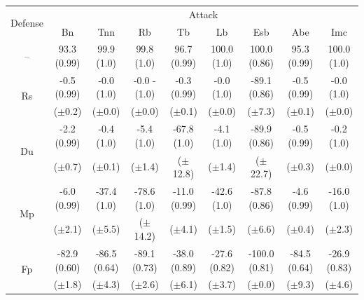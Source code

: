 \documentclass[compsoc,conference,a4paper,10pt,times]{IEEEtran}
\newcommand{\bn}{{\sc Bn}\xspace}
\newcommand{\tnn}{{\sc Tnn}\xspace}
\newcommand{\tb}{{\sc Tb}\xspace}
\newcommand{\lb}{{\sc Lb}\xspace}
\newcommand{\esb}{{\sc Esb}\xspace}
\newcommand{\rfb}{{\sc Rb}\xspace}
\newcommand{\abe}{{\sc Abe}\xspace}
\newcommand{\imc}{{\sc Imc}\xspace}
\newcommand{\du}{{\sc Du}\xspace}
\newcommand{\fp}{{\sc Fp}\xspace}
\newcommand{\rands}{{\sc Rs}\xspace}
\newcommand{\mmp}{{\sc Mp}\xspace}
\begin{document}
\begin{table}[!ht]{\footnotesize
    \centering
    \renewcommand{\arraystretch}{1.2}
    \begin{tabular}{c|c|c|c|c|c|c|c|c}
        \multirow{2}{*}{Defense} & \multicolumn{8}{c}{Attack} \\
        \cline{2-9}
             & \bn           & \tnn          & \rfb          & \tb           & \lb           & \esb          & \abe          & \imc \\
        \hline
        \hline
        -- & 93.3 (0.99) & 99.9 (1.0) & 99.8 (1.0) & 96.7 (0.99) & 100.0 (1.0) & 100.0 (0.86) & 95.3 (0.99) & 100.0 (1.0) \\
        \hline
        \hline
        \multirow{2}{*}{\rands}      & -0.5 (0.99) & -0.0 (1.0) & -0.0 -(1.0) & -0.3 (0.99) & -0.0 (1.0) & -89.1 (0.86) & -0.5 (0.99) & -0.0 (1.0)  \\
                                     & ($\pm$0.2) & ($\pm$0.0) & ($\pm$0.0) & ($\pm$0.1) & ($\pm$0.0) & ($\pm$7.3) & ($\pm$0.1) & ($\pm$0.0) \\
        \hline
        \multirow{2}{*}{\du}         & -2.2 (0.99) & -0.4 (1.0) & -5.4 (1.0) & \cellcolor{Red}-67.8 (1.0) & -4.1 (1.0) & \cellcolor{Red}-89.9 (0.86) & -0.5 (0.99) & -0.2 (1.0)      \\
                                     & ($\pm$0.7) & ($\pm$0.1) & ($\pm$1.4) & \cellcolor{Red}($\pm$12.8) & ($\pm$1.4) & \cellcolor{Red}($\pm$22.7) & ($\pm$0.3) & ($\pm$0.0)      \\
        \hline
        \multirow{2}{*}{\mmp}        & \cellcolor{Red}-6.0 (0.99) & \cellcolor{Red}-37.4 (1.0) & \cellcolor{Red}-78.6 (1.0) & -11.0 (0.99) & \cellcolor{Red} -42.6 (1.0) & -87.8 (0.86) & \cellcolor{Red}-4.6 (0.99) & \cellcolor{Red}-16.0 (1.0) \\
                                     & \cellcolor{Red}($\pm$2.1) & \cellcolor{Red}($\pm$5.5) & \cellcolor{Red}($\pm$14.2) & ($\pm$4.1) & \cellcolor{Red} ($\pm$1.5) & ($\pm$6.6) & \cellcolor{Red}($\pm$0.4) & \cellcolor{Red}($\pm$2.3) \\
        \hline
        \hline
        \multirow{2}{*}{\fp}         & -82.9 (0.60) & -86.5 (0.64) & -89.1 (0.73) & -38.0 (0.89) & -27.6 (0.82) & \cellcolor{Red}-100.0 (0.81) &-84.5 (0.64) & -26.9 (0.83) \\
                                     & ($\pm$1.8) & ($\pm$4.3) & ($\pm$2.6) & ($\pm$6.1) & ($\pm$3.7) & \cellcolor{Red}($\pm$0.0) & ($\pm$9.3) & ($\pm$4.6) \\

\end{tabular}}
\end{table}
\end{document}
